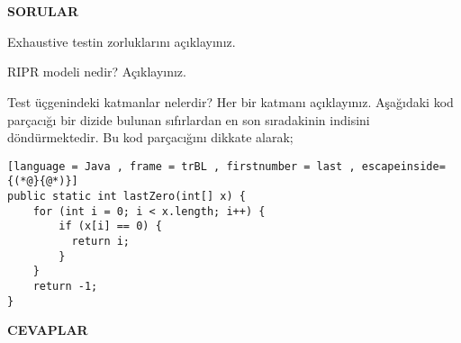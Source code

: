 \documentclass{exam}
\begin{document}
	\addpoints
	
	\begin{center}
		
	\end{center}
	
	\begin{center}
		\gradetable[h][questions]
	\end{center}
	
	\vspace{5mm}
	
	\vspace{5mm}
	\\\\
	
	
	
	\begin{center}
		\textbf{SORULAR}
	\end{center}
	\begin{questions}

		\question[25] Exhaustive testin zorluklarını açıklayınız.
	
		\question[25] RIPR modeli nedir? Açıklayınız.
		
		\question[25] Test üçgenindeki katmanlar nelerdir? Her bir katmanı açıklayınız.
		\question Aşağıdaki kod parçacığı bir dizide bulunan sıfırlardan en son sıradakinin indisini döndürmektedir. Bu kod parçacığını dikkate alarak;
		\begin{lstlisting}[language = Java , frame = trBL , firstnumber = last , escapeinside={(*@}{@*)}]
public static int lastZero(int[] x) {
    for (int i = 0; i < x.length; i++) {
		if (x[i] == 0) {
		  return i;
		}
	}
	return -1;
}
		\end{lstlisting}
		\hrulefill
		\begin{center}
			\textbf{CEVAPLAR}
		\end{center}

		
	\end{questions}
	
\end{document}
